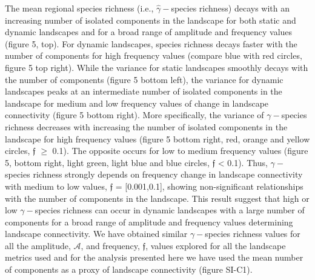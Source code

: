 \documentclass[12pt]{article}
\begin{document}
The mean regional species richness (i.e., $\hat{\gamma}-$species richness) decays with an increasing number of isolated components in the landscape for both static and dynamic landscapes and for a broad range of amplitude and frequency values (figure 5, top). For dynamic landscapes, species richness decays faster with the number of components for high frequency values (compare blue with red circles, figure 5 top right). While the variance for static landscapes smoothly decays with the number of components (figure 5 bottom left), the variance for dynamic landscapes peaks at an intermediate number of isolated components in the landscape for medium and low frequency values of change in landscape connectivity (figure 5 bottom right). More specifically, the variance of $\gamma-$species richness decreases with increasing the number of isolated components in the landscape for high frequency values (figure 5 bottom right, red, orange and yellow circles, $\mathfrak{f}$ $\geq$ 0.1). The opposite occurs for low to medium frequency values (figure 5, bottom right, light green, light blue and blue circles, $\mathfrak{f}$ < 0.1). Thus, $\gamma-$species richness strongly depends on frequency change  in landscape connectivity with medium to low values, $\mathfrak{f}$ = [0.001,0.1], showing non-significant relationships with the number of components in the landscape. This result suggest that high or low $\gamma-$species richness can occur in dynamic landscapes with a large number of components for a broad range of amplitude and frequency values determining landscape connectivity. We have obtained similar $\gamma-$species richness values for all the amplitude, $\mathcal{A}$, and frequency, $\mathfrak{f}$, values explored for all the landscape metrics used and for the analysis presented here we have used the mean number of components as a proxy of landscape connectivity (figure SI-C1).
\end{document}
